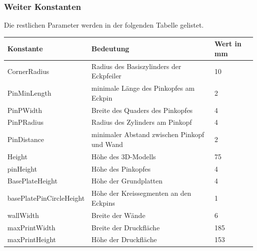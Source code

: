 \subsubsection{Weiter Konstanten}
Die restlichen Parameter werden in der folgenden Tabelle gelistet.
\begin{table}[h]
	\begin{tabularx}{\textwidth}{XXX}
	\toprule 
	Konstante & Bedeutung & Wert in mm \\ 
	\midrule 
	CornerRadius & Radius des Basiszylinders der Eckpfeiler & 10 \\ 
	\hline 
	PinMinLength & minimale Länge des Pinkopfes am Eckpin & 2 \\ 
	\hline 
	PinPWidth & Breite des Quaders des Pinkopfes & 4 \\ 
	\hline 
	PinPRadius & Radius des Zylinders am Pinkopf & 4 \\ 
	\hline 
	PinDistance & minimaler Abstand zwischen Pinkopf und Wand & 2 \\ 
	\hline 
	Height & Höhe des 3D-Modells & 75 \\ 
	\hline 
	pinHeight & Höhe des Pinkopfes & 4 \\ 
	\hline 
	BasePlateHeight & Höhe der Grundplatten & 4 \\ 
	\hline 
	basePlatePinCircleHeight & Höhe der Kreissegmenten an den Eckpins & 1 \\ 
	\hline 
	wallWidth & Breite der Wände & 6 \\ 
	\hline 
	maxPrintWidth & Breite der Druckfläche & 185 \\ 
	\hline 
	maxPrintHeight & Höhe der Druckfläche & 153 \\  
	\end{tabularx}
\end{table} 
